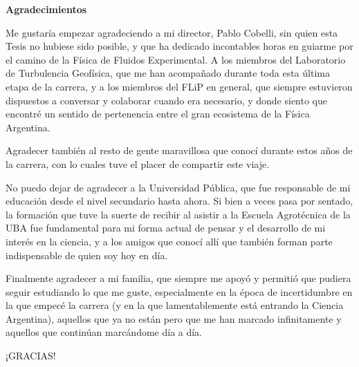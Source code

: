 \newenvironment{agradecimientos}%
{\thispagestyle{empty} \cleardoublepage\null \thispagestyle{empty} \vfill\begin{center}%
\bfseries Agradecimientos \end{center}}%
{\thispagestyle{empty} \vfill\null }

\begin{agradecimientos}
Me gustaría empezar agradeciendo a mi director, Pablo Cobelli, sin quien esta Tesis no hubiese sido posible, y que ha dedicado incontables horas en guiarme por el camino de la Física de Fluidos Experimental. A los miembros del Laboratorio de Turbulencia Geofísica, que me han acompañado durante toda esta última etapa de la carrera, y a los miembros del FLiP en general, que siempre estuvieron dispuestos a conversar y colaborar cuando era necesario, y donde siento que encontré un sentido de pertenencia entre el gran ecosistema de la Física Argentina.  

Agradecer también al resto de gente maravillosa que conocí durante estos años de la carrera, con lo cuales tuve el placer de compartir este viaje.  

No puedo dejar de agradecer a la Universidad Pública, que fue responsable de mi educación desde el nivel secundario hasta ahora. Si bien a veces pasa por sentado, la formación que tuve la suerte de recibir al asistir a la Escuela Agrotécnica de la UBA fue fundamental para mi forma actual de pensar y el desarrollo de mi interés en la ciencia, y a los amigos que conocí allí que también forman parte indispensable de quien soy hoy en día.  

Finalmente agradecer a mi familia, que siempre me apoyó y permitió que pudiera seguir estudiando lo que me guste, especialmente en la época de incertidumbre en la que empecé la carrera (y en la que lamentablemente está entrando la Ciencia Argentina), aquellos que ya no están pero que me han marcado infinitamente y aquellos que continúan marcándome día a día.   

\begin{center} 
	\huge ¡GRACIAS! 
\end{center} 

\end{agradecimientos}